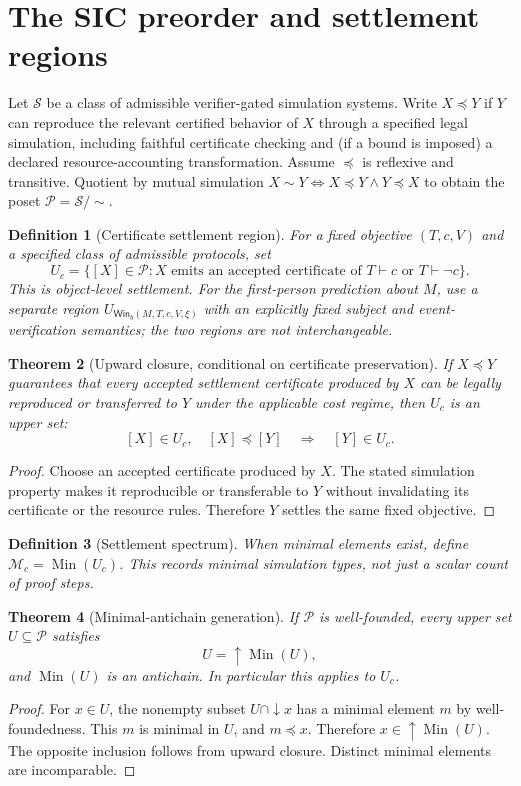 \documentclass[11pt,letterpaper]{article}
\newtheorem{definition}{Definition}[section]
\newtheorem{theorem}[definition]{Theorem}
\newcommand{\Win}{\mathsf{Win}}
\begin{document}
\section{The SIC preorder and settlement regions}
Let $\mathscr{S}$ be a class of admissible verifier-gated simulation systems. Write $X\preceq Y$ if $Y$ can reproduce the relevant certified behavior of $X$ through a specified legal simulation, including faithful certificate checking and (if a bound is imposed) a declared resource-accounting transformation. Assume $\preceq$ is reflexive and transitive. Quotient by mutual simulation $X\sim Y\iff X\preceq Y\land Y\preceq X$ to obtain the poset $\mathcal P=\mathscr S/{\sim}$.

\begin{definition}[Certificate settlement region]
For a fixed objective $(T,c,V)$ and a specified class of admissible protocols, set
\[
U_c=\{[X]\in\mathcal P: X\text{ emits an accepted certificate of }T\vdash c\text{ or }T\vdash\neg c\}.
\]
This is \emph{object-level} settlement. For the first-person prediction about $M$, use a separate region $U_{\Win_b(M,T,c,V,\xi)}$ with an explicitly fixed subject and event-verification semantics; the two regions are not interchangeable.
\end{definition}

\begin{theorem}[Upward closure, conditional on certificate preservation]
If $X\preceq Y$ guarantees that every accepted settlement certificate produced by $X$ can be legally reproduced or transferred to $Y$ under the applicable cost regime, then $U_c$ is an upper set:
\[
[X]\in U_c,\quad[X]\preceq[Y]\quad\Longrightarrow\quad[Y]\in U_c.
\]
\end{theorem}
\begin{proof}
Choose an accepted certificate produced by $X$. The stated simulation property makes it reproducible or transferable to $Y$ without invalidating its certificate or the resource rules. Therefore $Y$ settles the same fixed objective.\end{proof}

\begin{definition}[Settlement spectrum]
When minimal elements exist, define $\mathcal M_c=\operatorname{Min}(U_c)$. This records minimal \emph{simulation types}, not just a scalar count of proof steps.
\end{definition}

\begin{theorem}[Minimal-antichain generation]
If $\mathcal P$ is well-founded, every upper set $U\subseteq\mathcal P$ satisfies
\[
U=\uparrow\operatorname{Min}(U),
\]
and $\operatorname{Min}(U)$ is an antichain. In particular this applies to $U_c$.
\end{theorem}
\begin{proof}
For $x\in U$, the nonempty subset $U\cap\downarrow x$ has a minimal element $m$ by well-foundedness. This $m$ is minimal in $U$, and $m\preceq x$. Therefore $x\in\uparrow\operatorname{Min}(U)$. The opposite inclusion follows from upward closure. Distinct minimal elements are incomparable.\end{proof}
\end{document}
